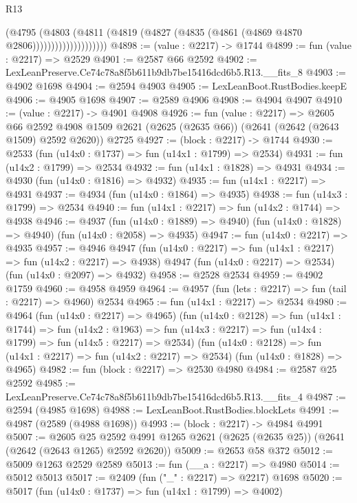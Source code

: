 \begin{lexlean}{R13}
\begin{coremodule}
                            (@4795
                              (@4803
                                (@4811
                                  (@4819 (@4827 (@4835 (@4861 (@4869 @4870 @2806))))))))))))))))))))
@4898 := (value : @2217) -> @1744
@4899 := fun (value : @2217) => @2529
@4901 := @2587 @66 @2592
@4902 := LexLeanPreserve.Ce74c78a8f5b611b9db7be15416dcd6b5.R13.__fits_8
@4903 := @4902 @1698
@4904 := @2594 @4903
@4905 := LexLeanBoot.RustBodies.keepE
@4906 := @4905 @1698
@4907 := @2589 @4906
@4908 := @4904 @4907
@4910 := (value : @2217) -> @4901 @4908
@4926 := fun (value : @2217) =>
  @2605
    @66
    @2592
    @4908
    @1509
    @2621
    (@2625 (@2635 @66))
    (@2641 (@2642 (@2643 @1509) @2592 @2620))
    @2725
@4927 := (block : @2217) -> @1744
@4930 := @2533 (fun (u14x0 : @1737) => fun (u14x1 : @1799) => @2534)
@4931 := fun (u14x2 : @1799) => @2534
@4932 := fun (u14x1 : @1828) => @4931
@4934 := @4930 (fun (u14x0 : @1816) => @4932)
@4935 := fun (u14x1 : @2217) => @4931
@4937 := @4934 (fun (u14x0 : @1864) => @4935)
@4938 := fun (u14x3 : @1799) => @2534
@4940 := fun (u14x1 : @2217) => fun (u14x2 : @1744) => @4938
@4946 := @4937
    (fun (u14x0 : @1889) => @4940)
    (fun (u14x0 : @1828) => @4940)
    (fun (u14x0 : @2058) => @4935)
@4947 := fun (u14x0 : @2217) => @4935
@4957 := @4946
    @4947
    (fun (u14x0 : @2217) => fun (u14x1 : @2217) => fun (u14x2 : @2217) => @4938)
    @4947
    (fun (u14x0 : @2217) => @2534)
    (fun (u14x0 : @2097) => @4932)
@4958 := @2528 @2534
@4959 := @4902 @1759
@4960 := @4958 @4959
@4964 := @4957 (fun (lets : @2217) => fun (tail : @2217) => @4960) @2534
@4965 := fun (u14x1 : @2217) => @2534
@4980 := @4964
    (fun (u14x0 : @2217) => @4965)
    (fun (u14x0 : @2128) =>
    fun (u14x1 : @1744) =>
    fun (u14x2 : @1963) =>
    fun (u14x3 : @2217) => fun (u14x4 : @1799) => fun (u14x5 : @2217) => @2534)
    (fun (u14x0 : @2128) => fun (u14x1 : @2217) => fun (u14x2 : @2217) => @2534)
    (fun (u14x0 : @1828) => @4965)
@4982 := fun (block : @2217) => @2530 @4980
@4984 := @2587 @25 @2592
@4985 := LexLeanPreserve.Ce74c78a8f5b611b9db7be15416dcd6b5.R13.__fits_4
@4987 := @2594 (@4985 @1698)
@4988 := LexLeanBoot.RustBodies.blockLets
@4991 := @4987 (@2589 (@4988 @1698))
@4993 := (block : @2217) -> @4984 @4991
@5007 := @2605
    @25
    @2592
    @4991
    @1265
    @2621
    (@2625 (@2635 @25))
    (@2641 (@2642 (@2643 @1265) @2592 @2620))
@5009 := @2653 @58 @372
@5012 := @5009 @1263 @2529 @2589
@5013 := fun (__a : @2217) => @4980
@5014 := @5012 @5013
@5017 := @2409 (fun ("_" : @2217) => @2217) @1698
@5020 := @5017 (fun (u14x0 : @1737) => fun (u14x1 : @1799) => @4002)

\end{coremodule}
\end{lexlean}
